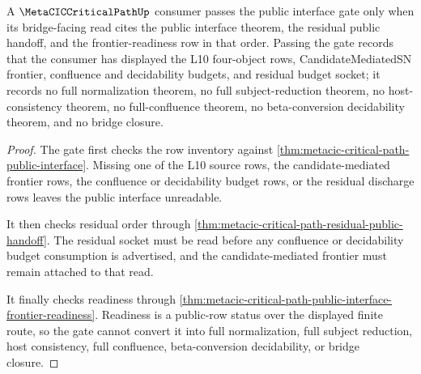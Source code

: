 \begin{theorem}
\label{thm:metacic-critical-path-public-interface-gate}
A $\MetaCICCriticalPathUp$ consumer passes the public interface gate only when its bridge-facing read cites the public interface theorem, the residual public handoff, and the frontier-readiness row in that order. Passing the gate records that the consumer has displayed the L10 four-object rows, CandidateMediatedSN frontier, confluence and decidability budgets, and residual budget socket; it records no full normalization theorem, no full subject-reduction theorem, no host-consistency theorem, no full-confluence theorem, no beta-conversion decidability theorem, and no bridge closure.
\end{theorem}
\begin{proof}
The gate first checks the row inventory against \autoref{thm:metacic-critical-path-public-interface}. Missing one of the L10 source rows, the candidate-mediated frontier rows, the confluence or decidability budget rows, or the residual discharge rows leaves the public interface unreadable.

It then checks residual order through \autoref{thm:metacic-critical-path-residual-public-handoff}. The residual socket must be read before any confluence or decidability budget consumption is advertised, and the candidate-mediated frontier must remain attached to that read.

It finally checks readiness through \autoref{thm:metacic-critical-path-public-interface-frontier-readiness}. Readiness is a public-row status over the displayed finite route, so the gate cannot convert it into full normalization, full subject reduction, host consistency, full confluence, beta-conversion decidability, or bridge closure.
\end{proof}
